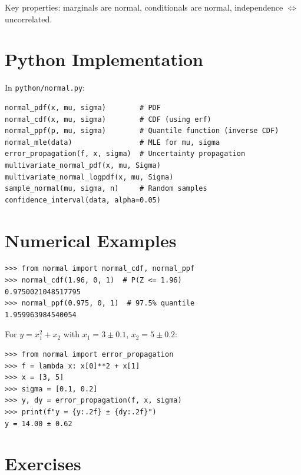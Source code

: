 Key properties: marginals are normal, conditionals are normal, independence $\Leftrightarrow$ uncorrelated.

\section{Python Implementation}

In \texttt{python/normal.py}:

\begin{lstlisting}[style=python, caption={Key functions in python/normal.py}]
normal_pdf(x, mu, sigma)        # PDF
normal_cdf(x, mu, sigma)        # CDF (using erf)
normal_ppf(p, mu, sigma)        # Quantile function (inverse CDF)
normal_mle(data)                # MLE for mu, sigma
error_propagation(f, x, sigma)  # Uncertainty propagation
multivariate_normal_pdf(x, mu, Sigma)
multivariate_normal_logpdf(x, mu, Sigma)
sample_normal(mu, sigma, n)     # Random samples
confidence_interval(data, alpha=0.05)
\end{lstlisting}

\section{Numerical Examples}

\begin{example}
\begin{lstlisting}[style=python]
>>> from normal import normal_cdf, normal_ppf
>>> normal_cdf(1.96, 0, 1)  # P(Z <= 1.96)
0.9750021048517795
>>> normal_ppf(0.975, 0, 1)  # 97.5% quantile
1.959963984540054
\end{lstlisting}
\end{example}

\begin{example}
For $y = x_1^2 + x_2$ with $x_1 = 3 \pm 0.1$, $x_2 = 5 \pm 0.2$:
\begin{lstlisting}[style=python]
>>> from normal import error_propagation
>>> f = lambda x: x[0]**2 + x[1]
>>> x = [3, 5]
>>> sigma = [0.1, 0.2]
>>> y, dy = error_propagation(f, x, sigma)
>>> print(f"y = {y:.2f} ± {dy:.2f}")
y = 14.00 ± 0.62
\end{lstlisting}
\end{example}

\section{Exercises}

